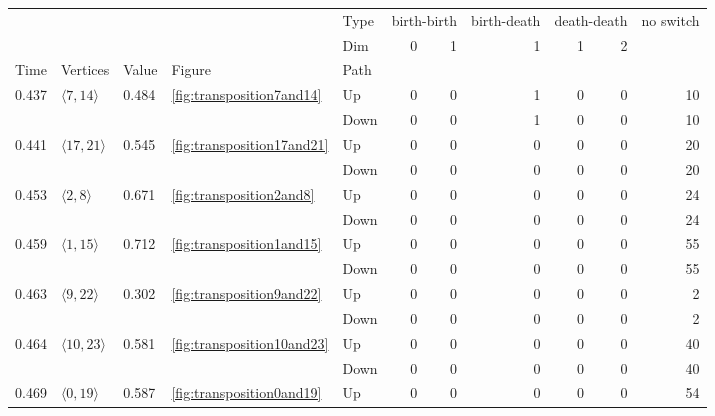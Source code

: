 \documentclass{article}
\begin{document}
\begin{center}
\begin{tabular}{lllllrrrrrr}
\toprule
 &  &  &  & Type & \multicolumn{2}{r}{birth-birth} & birth-death & \multicolumn{2}{r}{death-death} & no switch \\
 &  &  &  & Dim & 0 & 1 & 1 & 1 & 2 &  \\
Time & Vertices & Value & Figure & Path &  &  &  &  &  &  \\
\midrule
\multirow[t]{2}{*}{0.437} & \multirow[t]{2}{*}{$\langle7, 14\rangle$} & \multirow[t]{2}{*}{0.484} & \multirow[t]{2}{*}{\ref{fig:transposition7and14}} & Up & 0 & 0 & 1 & 0 & 0 & 10 \\
 &  &  &  & Down & 0 & 0 & 1 & 0 & 0 & 10 \\
\cline{1-11} \cline{2-11} \cline{3-11} \cline{4-11}
\multirow[t]{2}{*}{0.441} & \multirow[t]{2}{*}{$\langle17, 21\rangle$} & \multirow[t]{2}{*}{0.545} & \multirow[t]{2}{*}{\ref{fig:transposition17and21}} & Up & 0 & 0 & 0 & 0 & 0 & 20 \\
 &  &  &  & Down & 0 & 0 & 0 & 0 & 0 & 20 \\
\cline{1-11} \cline{2-11} \cline{3-11} \cline{4-11}
\multirow[t]{2}{*}{0.453} & \multirow[t]{2}{*}{$\langle2, 8\rangle$} & \multirow[t]{2}{*}{0.671} & \multirow[t]{2}{*}{\ref{fig:transposition2and8}} & Up & 0 & 0 & 0 & 0 & 0 & 24 \\
 &  &  &  & Down & 0 & 0 & 0 & 0 & 0 & 24 \\
\cline{1-11} \cline{2-11} \cline{3-11} \cline{4-11}
\multirow[t]{2}{*}{0.459} & \multirow[t]{2}{*}{$\langle1, 15\rangle$} & \multirow[t]{2}{*}{0.712} & \multirow[t]{2}{*}{\ref{fig:transposition1and15}} & Up & 0 & 0 & 0 & 0 & 0 & 55 \\
 &  &  &  & Down & 0 & 0 & 0 & 0 & 0 & 55 \\
\cline{1-11} \cline{2-11} \cline{3-11} \cline{4-11}
\multirow[t]{2}{*}{0.463} & \multirow[t]{2}{*}{$\langle9, 22\rangle$} & \multirow[t]{2}{*}{0.302} & \multirow[t]{2}{*}{\ref{fig:transposition9and22}} & Up & 0 & 0 & 0 & 0 & 0 & 2 \\
 &  &  &  & Down & 0 & 0 & 0 & 0 & 0 & 2 \\
\cline{1-11} \cline{2-11} \cline{3-11} \cline{4-11}
\multirow[t]{2}{*}{0.464} & \multirow[t]{2}{*}{$\langle10, 23\rangle$} & \multirow[t]{2}{*}{0.581} & \multirow[t]{2}{*}{\ref{fig:transposition10and23}} & Up & 0 & 0 & 0 & 0 & 0 & 40 \\
 &  &  &  & Down & 0 & 0 & 0 & 0 & 0 & 40 \\
\cline{1-11} \cline{2-11} \cline{3-11} \cline{4-11}
\multirow[t]{4}{*}{0.469} & \multirow[t]{2}{*}{$\langle0, 19\rangle$} & \multirow[t]{2}{*}{0.587} & \multirow[t]{2}{*}{\ref{fig:transposition0and19}} & Up & 0 & 0 & 0 & 0 & 0 & 54 \\

\end{tabular}
\end{center}
\end{document}
